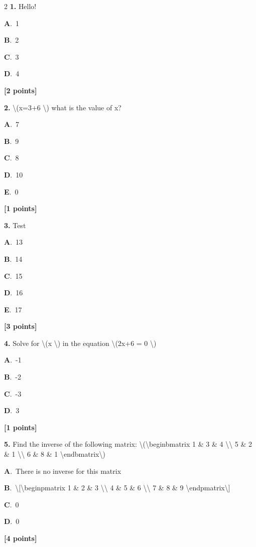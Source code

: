 \documentclass[12pt]{article}
\newcommand{\choice}[3]{%
  \noindent\textbf{#1}.~#2\hfill#3\par\vspace{0.25em}
}
\begin{document}
\begin{multicols}{2}
\noindent \textbf{\textenglish{1.}} {\textenglish{Hello!}}

\noindent\choice{A}{{\textenglish{1}}}{}
\noindent\choice{B}{{\textenglish{2}}}{}
\noindent\choice{C}{{\textenglish{3}}}{}
\noindent\choice{D}{{\textenglish{4}}}{}
\hfill \textbf{[2 points]}\vspace{0.5em}

\noindent \textbf{\textenglish{2.}} {\textenglish{\textbackslash{}(x=3+6 \textbackslash{}) what is the value of x?}}

\noindent\choice{A}{{\textenglish{7}}}{}
\noindent\choice{B}{{\textenglish{9}}}{}
\noindent\choice{C}{{\textenglish{8}}}{}
\noindent\choice{D}{{\textenglish{10}}}{}
\noindent\choice{E}{{\textenglish{0}}}{}
\hfill \textbf{[1 points]}\vspace{0.5em}

\noindent \textbf{\textenglish{3.}} {\textenglish{Test}}

\noindent\choice{A}{{\textenglish{13}}}{}
\noindent\choice{B}{{\textenglish{14}}}{}
\noindent\choice{C}{{\textenglish{15}}}{}
\noindent\choice{D}{{\textenglish{16}}}{}
\noindent\choice{E}{{\textenglish{17}}}{}
\hfill \textbf{[3 points]}\vspace{0.5em}

\noindent \textbf{\textenglish{4.}} {\textenglish{Solve for \textbackslash{}(x \textbackslash{}) in the equation \textbackslash{}(2x+6 = 0 \textbackslash{})}}

\noindent\choice{A}{{\textenglish{-1}}}{}
\noindent\choice{B}{{\textenglish{-2}}}{}
\noindent\choice{C}{{\textenglish{-3}}}{}
\noindent\choice{D}{{\textenglish{3}}}{}
\hfill \textbf{[1 points]}\vspace{0.5em}

\noindent \textbf{\textenglish{5.}} {\textenglish{Find the inverse of the following matrix: \textbackslash{}(\textbackslash{}begin{bmatrix} 1 \& 3 \& 4 \textbackslash{}\textbackslash{} 5 \& 2 \& 1 \textbackslash{}\textbackslash{} 6 \& 8 \& 1 \textbackslash{}end{bmatrix}\textbackslash{})}}

\noindent\choice{A}{{\textenglish{There is no inverse for this matrix}}}{}
\noindent\choice{B}{{\textenglish{\textbackslash{}[\textbackslash{}begin{pmatrix} 1 \& 2 \& 3 \textbackslash{}\textbackslash{} 4 \& 5 \& 6 \textbackslash{}\textbackslash{} 7 \& 8 \& 9  \textbackslash{}end{pmatrix}\textbackslash{}]}}}{}
\noindent\choice{C}{{\textenglish{0}}}{}
\noindent\choice{D}{{\textenglish{0}}}{}
\hfill \textbf{[4 points]}\vspace{0.5em}


\end{multicols}
\end{document}
